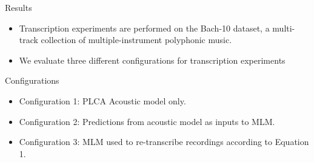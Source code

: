 \documentclass[final]{beamer}
\newlength{\onecolwid}
\newlength{\twocolwid}
\begin{document}
\begin{frame}[t]
\begin{columns}[t]
\begin{column}{\twocolwid}
\begin{columns}[t,totalwidth=\twocolwid]
\begin{column}{\onecolwid}
\begin{block}{Results}
\begin{table}[t]
 \begin{center}
\end{center}
 \caption{Transcription results using various system configurations.}
 \label{tab:results}
\end{table}

\begin{itemize}
\item Transcription experiments are performed on the Bach-10 dataset, a multi-track collection of multiple-instrument polyphonic music.
\item We evaluate three different configurations for transcription experiments
\end{itemize}

\begin{alertblock}{Configurations}
\begin{itemize}
\item Configuration 1: PLCA Acoustic model only. \\
\item Configuration 2: Predictions from acoustic model as inputs to MLM. 
\item Configuration 3: MLM used to re-transcribe recordings according to Equation 1.
\end{itemize}
\end{alertblock}


\end{block}
\end{column}
\end{columns}
\end{column}
\end{columns}
\end{frame}
\end{document}
